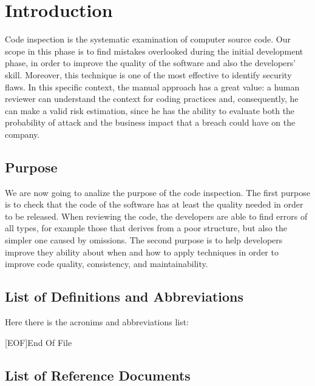 \section{Introduction} \label{sec:intro}

Code inspection is the systematic examination of computer source code. Our scope in this phase is to find mistakes overlooked during the initial development phase, in order to improve the quality of the software and also the developers' skill.\newline
Moreover, this technique is one of the most effective to identify security flaws. 
In this specific context, the manual approach has a great value: a human reviewer can understand the context for coding practices and, consequently, he can make a valid risk estimation, since he has the ability to evaluate both the probability of attack and the business impact that a breach could have on the company.

\subsection{Purpose}

We are now going to analize the purpose of the code inspection. \newline
The first purpose is to check that the code of the software has at least the quality needed in order to be released. When reviewing the code, the developers are able to find errors of all types, for example those that derives from a poor structure, but also the simpler one caused by omissions. \newline
The second purpose is to help developers improve they ability about when and how to apply techniques in order to improve code quality, consistency, and maintainability.

\subsection{List of Definitions and Abbreviations}
Here there is the acronims and abbreviations list:


\begin{acronym}[EOF] %

[EOF]{End Of File}

\end{acronym}

\subsection{List of Reference Documents}

